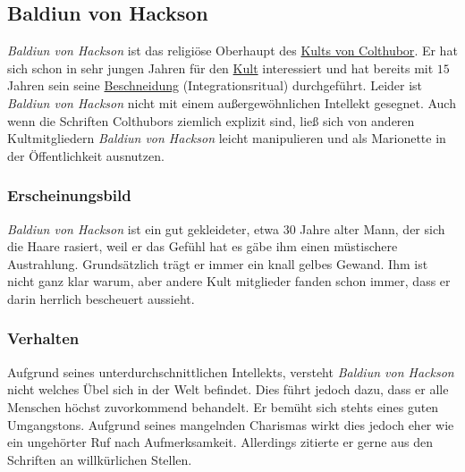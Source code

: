 \subsection{Baldiun von Hackson}
    \label{pers:baldiun-von-hackson}
    \emph{Baldiun von Hackson} ist das religiöse Oberhaupt des \hyperref[sons:kult-von-colthubor]{Kults von Colthubor}. Er hat sich schon in sehr jungen Jahren für den \hyperref[sons:kult-von-colthubor]{Kult} interessiert und hat bereits mit $15$ Jahren sein seine \hyperref[bla]{Beschneidung} (Integrationsritual) durchgeführt. Leider ist \emph{Baldiun von Hackson} nicht mit einem außergewöhnlichen Intellekt gesegnet. Auch wenn die Schriften Colthubors ziemlich explizit sind, ließ sich von anderen Kultmitgliedern \emph{Baldiun von Hackson} leicht manipulieren und als Marionette in der Öffentlichkeit ausnutzen.
    
    \subsubsection{Erscheinungsbild}
        \emph{Baldiun von Hackson} ist ein gut gekleideter, etwa 30 Jahre alter Mann, der sich die Haare rasiert, weil er das Gefühl hat es gäbe ihm einen müstischere Austrahlung. Grundsätzlich trägt er immer ein knall gelbes Gewand. Ihm ist nicht ganz klar warum, aber andere Kult mitglieder fanden schon immer, dass er darin herrlich bescheuert aussieht.

    \subsubsection{Verhalten}
        Aufgrund seines unterdurchschnittlichen Intellekts, versteht \emph{Baldiun von Hackson} nicht welches Übel sich in der Welt befindet. Dies führt jedoch dazu, dass er alle Menschen höchst zuvorkommend behandelt. Er bemüht sich stehts eines guten Umgangstons. Aufgrund seines mangelnden Charismas wirkt dies jedoch eher wie ein ungehörter Ruf nach Aufmerksamkeit. Allerdings zitierte er gerne aus den Schriften an willkürlichen Stellen.

